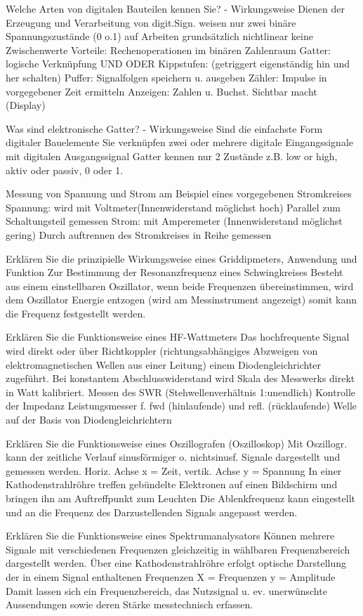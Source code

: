 \documentclass[avery5371,grid,frame,a4paper]{flashcards}
\newcommand{\card}[3]{
  \begin{flashcard}[{\chap} -- #1]{#2}#3\end{flashcard}
}
\begin{document}
\card{29}{Welche Arten von digitalen Bauteilen kennen Sie? - Wirkungsweise}{
  Dienen der Erzeugung und Verarbeitung von digit.Sign.
weisen nur zwei binäre Spannungszustände (0 o.1) auf
Arbeiten grundsätzlich nichtlinear keine Zwischenwerte
Vorteile: Rechenoperationen im binären Zahlenraum 
Gatter:  logische Verknüpfung UND ODER
Kippstufen:  (getriggert eigenständig hin und her schalten)
Puffer: Signalfolgen speichern u. ausgeben
Zähler: Impulse in vorgegebener Zeit ermitteln
Anzeigen: Zahlen u. Buchst. Sichtbar macht (Display)
}
\card{30}{Was sind elektronische Gatter? - Wirkungsweise}{
  Sind die einfachste Form digitaler Bauelemente
Sie verknüpfen zwei oder mehrere digitale Eingangssignale 
mit digitalen Ausgangssignal
Gatter kennen nur 2 Zustände z.B.  low or high, aktiv oder passiv,
0 oder 1.
}
\card{31}{Messung von Spannung und Strom am Beispiel eines vorgegebenen Stromkreises}{
  Spannung: wird mit Voltmeter(Innenwiderstand möglichst hoch)
Parallel zum Schaltungsteil gemessen
Strom: mit Amperemeter (Innenwiderstand möglichst gering) 
Durch auftrennen des Stromkreises in Reihe gemessen
}
\card{32}{Erklären Sie die prinzipielle Wirkungsweise eines Griddipmeters, Anwendung und Funktion}{
  Zur Bestimmung der Resonanzfrequenz eines Schwingkreises
Besteht aus einem einstellbaren Oszillator, wenn beide Frequenzen
übereinstimmen, wird dem Oszillator Energie entzogen
(wird am Messinstrument angezeigt) somit kann die Frequenz 
festgestellt werden.
}
\card{33}{Erklären Sie die Funktionsweise eines HF-Wattmeters}{
  Das hochfrequente Signal wird direkt oder über Richtkoppler 
(richtungsabhängiges Abzweigen von elektromagnetischen Wellen
aus einer Leitung) einem Diodengleichrichter zugeführt. 
Bei konstantem Abschlusswiderstand wird  Skala des 
Messwerks direkt in Watt kalibriert.
Messen des SWR (Stehwellenverhältnis 1:unendlich) Kontrolle
der Impedanz
Leistungsmesser f. fwd (hinlaufende) und refl. (rücklaufende) Welle
auf der Basis von Diodengleichrichtern 
}
\card{34}{Erklären Sie die Funktionsweise eines Oszillografen (Oszilloskop)}{
  Mit Oszillogr. kann der zeitliche Verlauf sinusförmiger o. nichtsinusf.
Signale dargestellt und gemessen werden.
Horiz. Achse x = Zeit,  vertik. Achse y = Spannung
In einer Kathodenstrahlröhre treffen gebündelte Elektronen auf einen 
Bildschirm und  bringen ihn am Auftreffpunkt zum Leuchten
Die Ablenkfrequenz kann eingestellt und an die Frequenz des
Darzustellenden Signals angepasst werden.
}
\card{35}{Erklären Sie die Funktionsweise eines Spektrumanalysators}{
  Können mehrere Signale mit verschiedenen Frequenzen gleichzeitig 
in wählbaren Frequenzbereich dargestellt werden.
Über  eine Kathodenstrahlröhre erfolgt optische Darstellung der in einem
Signal enthaltenen Frequenzen
X = Frequenzen  y = Amplitude
Damit lassen sich ein Frequenzbereich, das Nutzsignal u. ev. unerwünschte
Aussendungen sowie deren Stärke messtechnisch erfassen.
}
\end{document}
